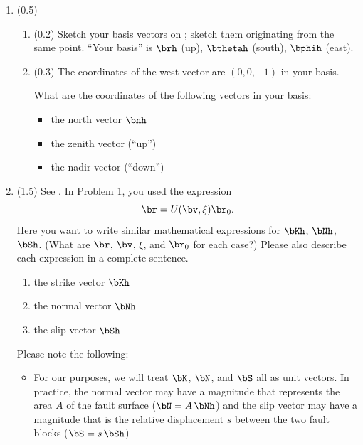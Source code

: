 \documentclass[11pt,titlepage,fleqn]{article}
\newcommand{\rotangB}{\xi}    %
\newcommand{\rotvec}{\bv}      %
\newcommand{\Umat}{U}
\begin{document}
\begin{enumerate}


\item (0.5)
\begin{enumerate}
\item (0.2) Sketch your basis vectors on ; sketch them originating from the same point. ``Your basis'' is $\brh$ (up), $\bthetah$ (south), $\bphih$ (east).

\item (0.3) The coordinates of the west vector are $(0,0,-1)$ in your basis.

What are the coordinates of the following vectors in your basis:

\begin{itemize}
\item the north vector $\bnh$

\item the zenith vector (``up'')

\item the nadir vector (``down'')
\end{itemize}
\end{enumerate}


\item (1.5) See . In Problem 1, you used the expression
%
\begin{equation}
\br = \Umat(\rotvec,\rotangB)\br_0.
\end{equation}
%
Here you want to write similar mathematical expressions for $\bKh$, $\bNh$, $\bSh$.
(What are $\br$, $\rotvec$, $\rotangB$, and $\br_0$ for each case?)
Please also describe each expression in a complete sentence.
%
\begin{enumerate}
\item the strike vector $\bKh$
\item the normal vector $\bNh$
\item the slip vector $\bSh$
\end{enumerate}
%
Please note the following:
%
\begin{itemize}
\item For our purposes, we will treat $\bK$, $\bN$, and $\bS$ all as unit vectors. In practice, the normal vector may have a magnitude that represents the area $A$ of the fault surface ($\bN = A\,\bNh$) and the slip vector may have a magnitude that is the relative displacement $s$ between the two fault blocks ($\bS = s\,\bSh$)


\end{itemize}
\end{enumerate}
\end{document}
